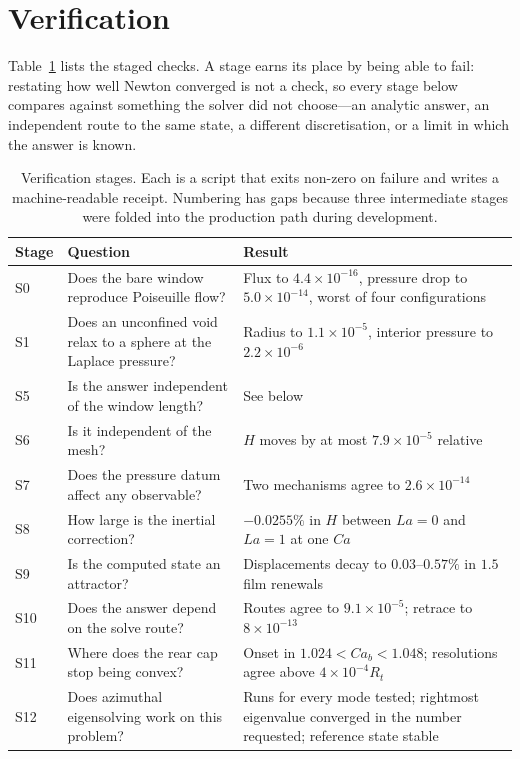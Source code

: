 \documentclass[11pt,a4paper]{article}
\begin{document}
\section{Verification}
\label{sec:verification}

Table~\ref{tab:stages} lists the staged checks. A stage earns its place by
being able to fail: restating how well Newton converged is not a check, so
every stage below compares against something the solver did not choose---an
analytic answer, an independent route to the same state, a different
discretisation, or a limit in which the answer is known.

\begin{table}[t]
  \centering
  \caption{Verification stages. Each is a script that exits non-zero on failure
  and writes a machine-readable receipt. Numbering has gaps because three
  intermediate stages were folded into the production path during development.}
  \label{tab:stages}
  \small
  \begin{tabular}{@{}lp{50mm}p{72mm}@{}}
    \toprule
    Stage & Question & Result \\
    \midrule
    S0 & Does the bare window reproduce Poiseuille flow? & Flux to $4.4\times10^{-16}$, pressure drop to $5.0\times10^{-14}$, worst of four configurations \\
    S1 & Does an unconfined void relax to a sphere at the Laplace pressure? & Radius to $1.1\times10^{-5}$, interior pressure to $2.2\times10^{-6}$ \\
    S5 & Is the answer independent of the window length? & See below \\
    S6 & Is it independent of the mesh? & $H$ moves by at most $7.9\times10^{-5}$ relative \\
    S7 & Does the pressure datum affect any observable? & Two mechanisms agree to $2.6\times10^{-14}$ \\
    S8 & How large is the inertial correction? & $-0.0255\%$ in $H$ between $La=0$ and $La=1$ at one $Ca$ \\
    S9 & Is the computed state an attractor? & Displacements decay to $0.03$--$0.57\%$ in $1.5$ film renewals \\
    S10 & Does the answer depend on the solve route? & Routes agree to $9.1\times10^{-5}$; retrace to $8\times10^{-13}$ \\
    S11 & Where does the rear cap stop being convex? & Onset in $1.024<Ca_b<1.048$; resolutions agree above $4\times10^{-4}R_t$ \\
    S12 & Does azimuthal eigensolving work on this problem? & Runs for every mode tested; rightmost eigenvalue converged in the number requested; reference state stable \\

\end{tabular}
\end{table}
\end{document}

